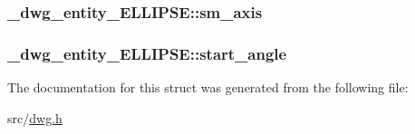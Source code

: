 \hypertarget{struct__dwg__entity__ELLIPSE_a64698ec29610897e229ab08339097b3a}{
\subsubsection[{sm\-\_\-axis}]{ {\bf \-\_\-dwg\-\_\-entity\-\_\-\-E\-L\-L\-I\-P\-S\-E\-::sm\-\_\-axis}}}\label{struct__dwg__entity__ELLIPSE_a64698ec29610897e229ab08339097b3a}
\hypertarget{struct__dwg__entity__ELLIPSE_a600d765d6de9feb5eadcbbccb313d699}{
\subsubsection[{start\-\_\-angle}]{ {\bf \-\_\-dwg\-\_\-entity\-\_\-\-E\-L\-L\-I\-P\-S\-E\-::start\-\_\-angle}}}\label{struct__dwg__entity__ELLIPSE_a600d765d6de9feb5eadcbbccb313d699}


\-The documentation for this struct was generated from the following file\-:\begin{DoxyCompactItemize}
\item 
src/\hyperlink{dwg_8h}{dwg.\-h}\end{DoxyCompactItemize}
